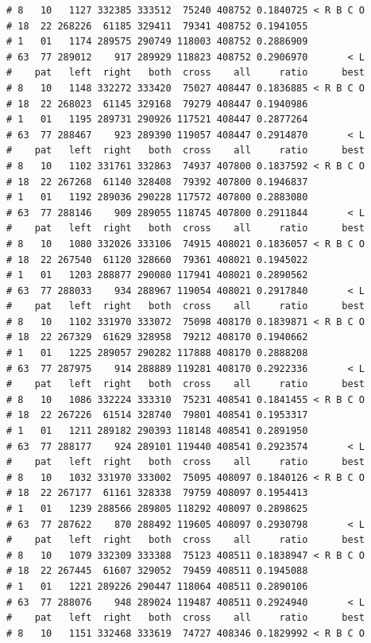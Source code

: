 \documentclass{article}\usepackage[]{graphicx}\usepackage[]{color}
\makeatletter
\newenvironment{kframe}{%
 \def\at@end@of@kframe{}%
 \ifinner\ifhmode%
  \def\at@end@of@kframe{\end{minipage}}%
  \begin{minipage}{\columnwidth}%
 \fi\fi%
 \def\FrameCommand##1{\hskip\@totalleftmargin \hskip-\fboxsep
 \colorbox{shadecolor}{##1}\hskip-\fboxsep
     \hskip-\linewidth \hskip-\@totalleftmargin \hskip\columnwidth}%
 \MakeFramed {\advance\hsize-\width
   \@totalleftmargin\z@ \linewidth\hsize
   \@setminipage}}%
 {\par\unskip\endMakeFramed%
 \at@end@of@kframe}
\newenvironment{knitrout}{}{} %
\makeatother
\begin{document}
\begin{knitrout}
\begin{kframe}
\begin{verbatim}
# 8   10   1127 332385 333512  75240 408752 0.1840725 < R B C O
# 18  22 268226  61185 329411  79341 408752 0.1941055          
# 1   01   1174 289575 290749 118003 408752 0.2886909          
# 63  77 289012    917 289929 118823 408752 0.2906970       < L
#    pat   left  right   both  cross    all     ratio      best
# 8   10   1148 332272 333420  75027 408447 0.1836885 < R B C O
# 18  22 268023  61145 329168  79279 408447 0.1940986          
# 1   01   1195 289731 290926 117521 408447 0.2877264          
# 63  77 288467    923 289390 119057 408447 0.2914870       < L
#    pat   left  right   both  cross    all     ratio      best
# 8   10   1102 331761 332863  74937 407800 0.1837592 < R B C O
# 18  22 267268  61140 328408  79392 407800 0.1946837          
# 1   01   1192 289036 290228 117572 407800 0.2883080          
# 63  77 288146    909 289055 118745 407800 0.2911844       < L
#    pat   left  right   both  cross    all     ratio      best
# 8   10   1080 332026 333106  74915 408021 0.1836057 < R B C O
# 18  22 267540  61120 328660  79361 408021 0.1945022          
# 1   01   1203 288877 290080 117941 408021 0.2890562          
# 63  77 288033    934 288967 119054 408021 0.2917840       < L
#    pat   left  right   both  cross    all     ratio      best
# 8   10   1102 331970 333072  75098 408170 0.1839871 < R B C O
# 18  22 267329  61629 328958  79212 408170 0.1940662          
# 1   01   1225 289057 290282 117888 408170 0.2888208          
# 63  77 287975    914 288889 119281 408170 0.2922336       < L
#    pat   left  right   both  cross    all     ratio      best
# 8   10   1086 332224 333310  75231 408541 0.1841455 < R B C O
# 18  22 267226  61514 328740  79801 408541 0.1953317          
# 1   01   1211 289182 290393 118148 408541 0.2891950          
# 63  77 288177    924 289101 119440 408541 0.2923574       < L
#    pat   left  right   both  cross    all     ratio      best
# 8   10   1032 331970 333002  75095 408097 0.1840126 < R B C O
# 18  22 267177  61161 328338  79759 408097 0.1954413          
# 1   01   1239 288566 289805 118292 408097 0.2898625          
# 63  77 287622    870 288492 119605 408097 0.2930798       < L
#    pat   left  right   both  cross    all     ratio      best
# 8   10   1079 332309 333388  75123 408511 0.1838947 < R B C O
# 18  22 267445  61607 329052  79459 408511 0.1945088          
# 1   01   1221 289226 290447 118064 408511 0.2890106          
# 63  77 288076    948 289024 119487 408511 0.2924940       < L
#    pat   left  right   both  cross    all     ratio      best
# 8   10   1151 332468 333619  74727 408346 0.1829992 < R B C O

\end{verbatim}
\end{kframe}
\end{knitrout}
\end{document}

